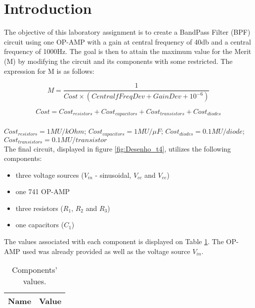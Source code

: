 
\section{Introduction}
\label{sec:introduction}



The objective of this laboratory assignment is to create a BandPass Filter (BPF) circuit using one OP-AMP with a gain at central frequency of 40db and a central frequency of 1000Hz. The goal is then to attain the maximum value for the Merit (M) by modifying the circuit and its components with some restricted. The expression for M is as follows:

\[
M = \frac{1}{Cost\times (CentralfFreqDev + GainDev + 10^{-6})}
\]

\[
 Cost = Cost_{resistors} + Cost_{capacitors} + Cost_{transistors} + Cost_{diodes} 
\] \\

$Cost_{resistors} = 1MU/kOhm$; $Cost_{capacitors} = 1MU/\mu F$; $Cost_{diodes} = 0.1MU/diode$; $Cost_{transistors} = 0.1MU/transistor$ \\

The final circuit, displayed in figure \ref{fig:Desenho_t4}, utilizes the following components:

\begin{itemize}
	\item three voltage sources ($V_{in}$ - sinusoidal, $V_{cc}$ and $V_{ee}$)
	\item one 741 OP-AMP
	\item three resistors ($R_1$, $R_2$ and $R_3$)
	\item one capacitors ($C_1$)
\end{itemize}

The values associated with each component is displayed on Table \ref{tab:vlr}. The OP-AMP used was already provided as well as the voltage source $V_{in}$.

\begin{table}[ht]
	\centering
	\begin{tabular}{|l|r|}
		\hline    
		{\bf Name} & {\bf Value} \\ \hline
    		
	\end{tabular}
	
	\caption{Components' values.}
    
\label{tab:vlr}
\end{table}


